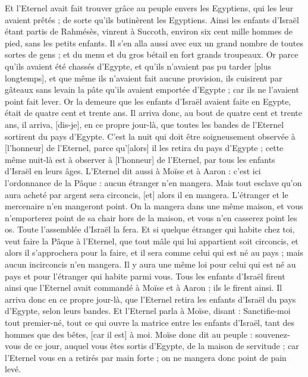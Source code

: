 \begin{multicols}{2}
Et l'Eternel avait fait trouver grâce au peuple envers les Egyptiens, qui les leur avaient prêtés ; de sorte qu'ils butinèrent les Egyptiens.
Ainsi les enfants d'Israël étant partis de Rahmésès, vinrent à Succoth, environ six cent mille hommes de pied, sans les petits enfants.
Il s'en alla aussi avec eux un grand nombre de toutes sortes de gens ; et du menu et du gros bétail en fort grands troupeaux.
Or parce qu'ils avaient été chassés d'Egypte, et qu'ils n'avaient pas pu tarder [plus longtemps], et que même ils n'avaient fait aucune provision, ils cuisirent par gâteaux sans levain la pâte qu'ils avaient emportée d'Egypte ; car ils ne l'avaient point fait lever.
Or la demeure que les enfants d'Israël avaient faite en Egypte, était de quatre cent et trente ans.
Il arriva donc, au bout de quatre cent et trente ans, il arriva, [dis-je], en ce propre jour-là, que toutes les bandes de l'Eternel sortirent du pays d'Egypte.
C'est la nuit qui doit être soigneusement observée à [l'honneur] de l'Eternel, parce qu'[alors] il les retira du pays d'Egypte ; cette même nuit-là est à observer à [l'honneur] de l'Eternel, par tous les enfants d'Israël en leurs âges.
L'Eternel dit aussi à Moïse et à Aaron : c'est ici l'ordonnance de la Pâque : aucun étranger n'en mangera.
Mais tout esclave qu'on aura acheté par argent sera circoncis, [et] alors il en mangera.
L'étranger et le mercenaire n'en mangeront point.
On la mangera dans une même maison, et vous n'emporterez point de sa chair hors de la maison, et vous n'en casserez point les os.
Toute l'assemblée d'Israël la fera.
Et si quelque étranger qui habite chez toi, veut faire la Pâque à l'Eternel, que tout mâle qui lui appartient soit circoncis, et alors il s'approchera pour la faire, et il sera comme celui qui est né au pays ; mais aucun incirconcis n'en mangera.
Il y aura une même loi pour celui qui est né au pays et pour l'étranger qui habite parmi vous.
Tous les enfants d'Israël firent ainsi que l'Eternel avait commandé à Moïse et à Aaron ; ils le firent ainsi.
Il arriva donc en ce propre jour-là, que l'Eternel retira les enfants d'Israël du pays d'Egypte, selon leurs bandes.
\VerseOne{}Et l'Eternel parla à Moïse, disant :
Sanctifie-moi tout premier-né, tout ce qui ouvre la matrice entre les enfants d'Israël, tant des hommes que des bêtes, [car il est] à moi.
Moïse donc dit au peuple : souvenez-vous de ce jour, auquel vous êtes sortis d'Egypte, de la maison de servitude ; car l'Eternel vous en a retirés par main forte ; on ne mangera donc point de pain levé.

\end{multicols}
